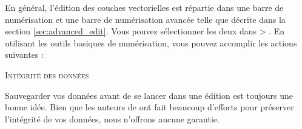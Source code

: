
En général, l'édition des couches vectorielles est répartie dans une barre de numérisation et une barre de numérisation avancée telle que décrite dans la section \ref{sec:advanced_edit}. Vous pouvez sélectionner les deux dans  > . En utilisant les outils basiques de numérisation, vous pouvez accomplir les actions suivantes :

\begin{Tip}[ht]\caption{\textsc{Intégrité des données}}
Sauvegarder vos données avant de se lancer dans une édition est toujours une bonne idée. Bien que les auteurs de \qg ont fait beaucoup d'efforts pour préserver l'intégrité de vos données, nous n'offrons aucune garantie.
\end{Tip}
